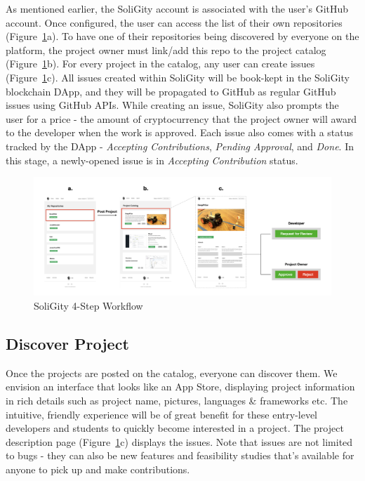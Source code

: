 \documentclass[12pt]{article}
\renewcommand{\_}{\kern-1.5pt\textunderscore\kern-1.5pt}
\begin{document}
As mentioned earlier, the SoliGity account is associated with the user’s GitHub account. Once configured, the user can access the list of their own repositories (Figure~\ref{fig:workflow2}a). To have one of their repositories being discovered by everyone on the platform, the project owner must link/add this repo to the project catalog (Figure~\ref{fig:workflow2}b). For every project in the catalog, any user can create issues (Figure~\ref{fig:workflow2}c). All issues created within SoliGity will be book-kept in the SoliGity blockchain DApp, and they will be propagated to GitHub as regular GitHub issues using GitHub APIs. While creating an issue, SoliGity also prompts the user for a price - the amount of cryptocurrency that the project owner will award to the developer when the work is approved. Each issue also comes with a status tracked by the DApp - \textit{Accepting Contributions}, \textit{Pending Approval}, and \textit{Done}. In this stage, a newly-opened issue is in \textit{Accepting Contribution} status.


\begin{figure}[H]
	\centering
	\includegraphics[width=16.5cm]{graphs/00b. workflow.jpeg}
	\caption{SoliGity 4-Step Workflow}
	\label{fig:workflow2}
\end{figure}

\subsection{Discover Project}

Once the projects are posted on the catalog, everyone can discover them. We envision an interface that looks like an App Store, displaying project information in rich details such as project name, pictures, languages \& frameworks etc. The intuitive, friendly experience will be of great benefit for these entry-level developers and students to quickly become interested in a project. The project description page (Figure~\ref{fig:workflow2}c) displays the issues. Note that issues are not limited to bugs - they can also be new features and feasibility studies that’s available for anyone to pick up and make contributions.
\end{document}
